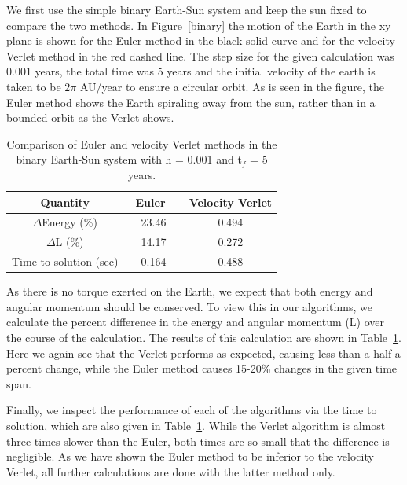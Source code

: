\documentclass[prc,amsmath,twocolumn,superscriptaddress]{revtex4}
\begin{document}
We first use the simple binary Earth-Sun system and keep the sun fixed to compare the two methods. In Figure~\ref{binary} the motion of the Earth in the xy plane is shown for the Euler method in the black solid curve and for the velocity Verlet method in the red dashed line. The step size for the given calculation was 0.001 years, the total time was 5 years and the initial velocity of the earth is taken to be $2\pi$ AU/year to ensure a circular orbit. As is seen in the figure, the Euler method shows the Earth spiraling away from the sun, rather than in a bounded orbit as the Verlet shows. 
\begin{table}[t]
\centering
\begin{tabular}{|c|c|c|}
\hline
Quantity&~Euler~~&Velocity Verlet\\
\hline
$\Delta$Energy (\%)&23.46&0.494\\
$\Delta$L (\%)&14.17&0.272\\
Time to solution (sec)&0.164&0.488\\
\hline
\end{tabular}
\caption{Comparison of Euler and velocity Verlet methods in the binary Earth-Sun system with h = 0.001 and t$_{f}$ = 5 years.}
\label{nrg}
\end{table}
As there is no torque exerted on the Earth, we expect that both energy and angular momentum should be conserved. To view this in our algorithms, we calculate the percent difference in the energy and angular momentum (L) over the course of the calculation. The results of this calculation are shown in Table~\ref{nrg}. Here we again see that the Verlet performs as expected, causing less than a half a percent change, while the Euler method causes 15-20\% changes in the given time span.

Finally, we inspect the performance of each of the algorithms via the time to solution, which are also given in Table~\ref{nrg}. While the Verlet algorithm is almost three times slower than the Euler, both times are so small that the difference is negligible. As we have shown the Euler method to be inferior to the velocity Verlet, all further calculations are done with the latter method only.
\end{document}
